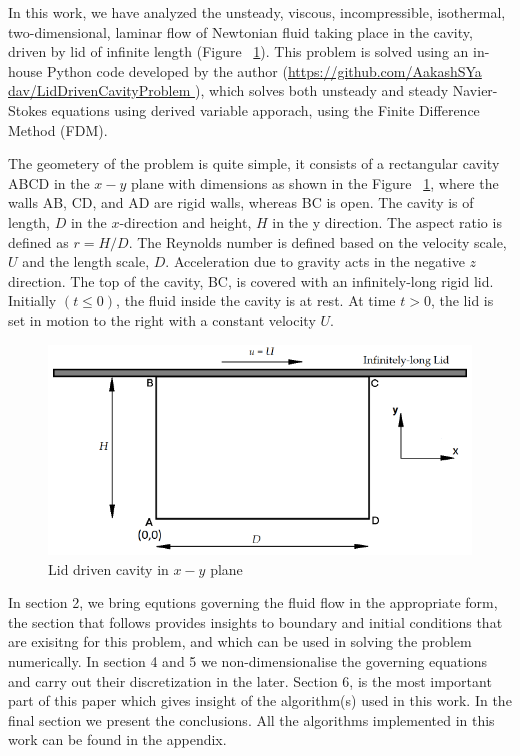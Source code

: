 \documentclass{article}
\begin{document}
In this work, we have analyzed the unsteady, viscous, incompressible, isothermal, two-dimensional, laminar flow of Newtonian fluid taking place in the cavity, driven by lid of infinite length (Figure ~\ref{fig:cavityFig}). 
This problem is solved using an in-house Python code developed by the author (\href{https://github.com/AakashSYadav/LidDrivenCavityProblem}{https://github.com/AakashSYa dav/LidDrivenCavityProblem }), which solves both unsteady and steady  Navier-Stokes equations using derived variable apporach, using the Finite Difference Method (FDM).

The geometery of the problem is quite simple, it consists of a rectangular cavity ABCD in the $x-y$ plane with dimensions as shown in the Figure ~\ref{fig:cavityFig}, where the walls AB, CD, and AD are rigid walls, whereas BC is open. The cavity is of length, $D$ in the $x$-direction and height, $H$ in the y direction. The aspect ratio is defined as $r=H/D$. The Reynolds number is defined based on the velocity scale, $U$ and the length scale, $D$. Acceleration due to gravity acts in the negative $z$ direction. The top of the cavity, BC, is covered with an infinitely-long rigid lid. Initially $(t \leq 0)$, the fluid inside the cavity is at rest. At time $t > 0$, the lid is set in motion to the right with a constant velocity $U $. 

\begin{figure}[h!]
\centering
\includegraphics[scale=.5]{cavityFig.png}
\caption{Lid driven cavity in $x-y$ plane}
\label{fig:cavityFig}
\end{figure}

In section 2, we bring equtions governing the fluid flow in the appropriate form, the section that follows provides insights to boundary and initial conditions that are exisitng for this problem, and which can be used in solving the problem numerically. In section 4 and 5 we non-dimensionalise the governing equations and carry out their discretization in the later. Section 6, is the most important part of this paper which gives insight of the algorithm(s) used in this work. In the final section we present the conclusions. All the algorithms implemented in this work can be found in the appendix.
\end{document}

